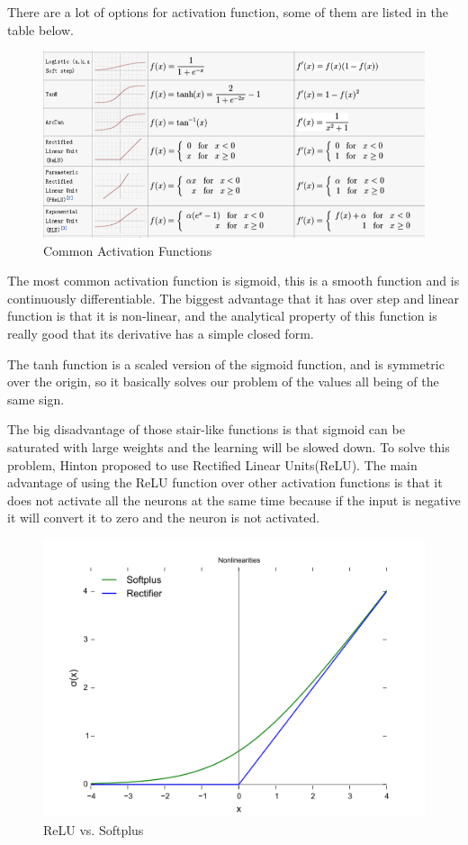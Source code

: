 \documentclass[10pt,twocolumn,letterpaper]{article}
\begin{document}
	There are a lot of options for activation function, some of them are listed in the table below.
	
	\begin{figure}[h]
		\begin{center}
			\includegraphics[width=0.8\linewidth]{images/activation}
			\caption{Common Activation Functions}
		\end{center}
	\end{figure}

	The most common activation function is sigmoid, this is a smooth function and is continuously differentiable. The biggest advantage that it has over step and linear function is that it is non-linear\cite{gupta_bansal_srivastava_jain_2017}, and the analytical property of this function is really good that its derivative has a simple closed form.
	
	The tanh function is a scaled version of the sigmoid function, and is symmetric over the origin, so it basically solves our problem of the values all being of the same sign\cite{gupta_bansal_srivastava_jain_2017}.
	
	The big disadvantage of those stair-like functions is that sigmoid can be saturated with large weights and the learning will be slowed down\cite{kotsiantis2007supervised}. To solve this problem, Hinton\cite{kotsiantis2007supervised} proposed to use Rectified Linear Units(ReLU). The main advantage of using the ReLU function over other activation functions is that it does not activate all the neurons at the same time\cite{gupta_bansal_srivastava_jain_2017} because if the input is negative it will convert it to zero and the neuron is not activated.
	
	\begin{figure}[h]
		\begin{center}
			\includegraphics[width=0.8\linewidth]{images/relu}
			\caption{ReLU vs. Softplus}
		\end{center}
	\end{figure}
	
\end{document}

